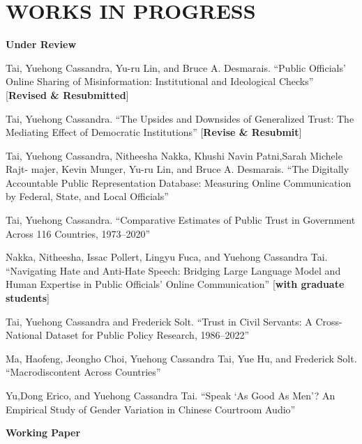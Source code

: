 \documentclass[10.5pt,]{article}
\providecommand{\tightlist}{%
	\setlength{\itemsep}{0pt}\setlength{\parskip}{0pt}}
\renewenvironment{itemize}{
	\begin{list}{}{
			\setlength{\leftmargin}{1.5em}
		}
	}{
	\end{list}
}
\begin{document}
\section{WORKS IN PROGRESS}\label{works-in-progress}

\begin{itemize}
\tightlist
\item
  \textbf{Under Review}

  \begin{itemize}
  \tightlist
  \item
    Tai, Yuehong Cassandra, Yu-ru Lin, and Bruce A. Desmarais. ``Public
    Oﬀicials' Online Sharing of Misinformation: Institutional and
    Ideological Checks'' {[}\textbf{Revised \& Resubmitted}{]}
  \item
    Tai, Yuehong Cassandra. ``The Upsides and Downsides of Generalized
    Trust: The Mediating Effect of Democratic Institutions''
    {[}\textbf{Revise \& Resubmit}{]}
  \item
    Tai, Yuehong Cassandra, Nitheesha Nakka, Khushi Navin Patni,Sarah
    Michele Rajt- majer, Kevin Munger, Yu-ru Lin, and Bruce A.
    Desmarais. ``The Digitally Accountable Public Representation
    Database: Measuring Online Communication by Federal, State, and
    Local Oﬀicials''
  \item
    Tai, Yuehong Cassandra. ``Comparative Estimates of Public Trust in
    Government Across 116 Countries, 1973--2020''
  \item
    Nakka, Nitheesha, Issac Pollert, Lingyu Fuca, and Yuehong Cassandra
    Tai. ``Navigating Hate and Anti-Hate Speech: Bridging Large Language
    Model and Human Expertise in Public Oﬀicials' Online Communication''
    {[}\textbf{with graduate students}{]}
  \item
    Tai, Yuehong Cassandra and Frederick Solt. ``Trust in Civil
    Servants: A Cross-National Dataset for Public Policy Research,
    1986--2022''
  \item
    Ma, Haofeng, Jeongho Choi, Yuehong Cassandra Tai, Yue Hu, and
    Frederick Solt. ``Macrodiscontent Across Countries''
  \item
    Yu,Dong Erico, and Yuehong Cassandra Tai. ``Speak `As Good As Men'?
    An Empirical Study of Gender Variation in Chinese Courtroom Audio''
  \end{itemize}
\item
  \textbf{Working Paper}


\end{itemize}
\end{document}
